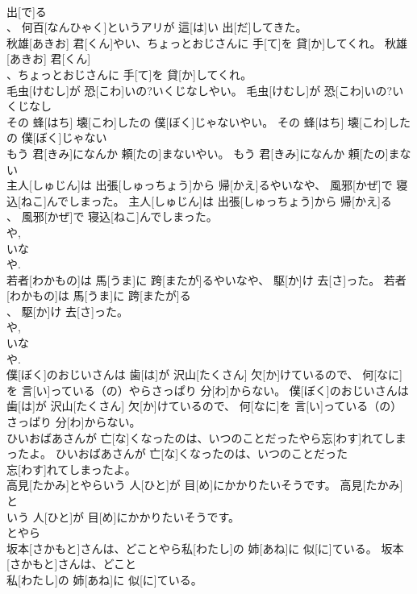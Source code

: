 \documentclass[8pt]{extreport}
\begin{document}
\begin{CJK}{UTF8}{min}
\\	出[で]る
\\	、 何百[なんひゃく]というアリが 這[は]い 出[だ]してきた。	
\\	秋雄[あきお] 君[くん]やい、ちょっとおじさんに 手[て]を 貸[か]してくれ。	秋雄[あきお] 君[くん]
\\	、ちょっとおじさんに 手[て]を 貸[か]してくれ。	
\\	毛虫[けむし]が 恐[こわ]いの?いくじなしやい。	毛虫[けむし]が 恐[こわ]いの?いくじなし
\\	その 蜂[はち] 壊[こわ]したの 僕[ぼく]じゃないやい。	その 蜂[はち] 壊[こわ]したの 僕[ぼく]じゃない
\\	もう 君[きみ]になんか 頼[たの]まないやい。	もう 君[きみ]になんか 頼[たの]まない
\\	主人[しゅじん]は 出張[しゅっちょう]から 帰[かえ]るやいなや、 風邪[かぜ]で 寝込[ねこ]んでしまった。	主人[しゅじん]は 出張[しゅっちょう]から 帰[かえ]る
\\	、 風邪[かぜ]で 寝込[ねこ]んでしまった。	
\\	や, 
\\	いな 
\\	や.
\\	若者[わかもの]は 馬[うま]に 跨[またが]るやいなや、 駆[か]け 去[さ]った。	若者[わかもの]は 馬[うま]に 跨[またが]る
\\	、 駆[か]け 去[さ]った。	
\\	や, 
\\	いな 
\\	や.
\\	僕[ぼく]のおじいさんは 歯[は]が 沢山[たくさん] 欠[か]けているので、 何[なに]を 言[い]っている（の）やらさっぱり 分[わ]からない。	僕[ぼく]のおじいさんは 歯[は]が 沢山[たくさん] 欠[か]けているので、 何[なに]を 言[い]っている（の）
\\	さっぱり 分[わ]からない。	
\\	ひいおばあさんが 亡[な]くなったのは、いつのことだったやら忘[わす]れてしまったよ。	ひいおばあさんが 亡[な]くなったのは、いつのことだった
\\	忘[わす]れてしまったよ。	
\\	高見[たかみ]とやらいう 人[ひと]が 目[め]にかかりたいそうです。	高見[たかみ]と
\\	いう 人[ひと]が 目[め]にかかりたいそうです。	
\\	とやら
\\	坂本[さかもと]さんは、どことやら私[わたし]の 姉[あね]に 似[に]ている。	坂本[さかもと]さんは、どこと
\\	私[わたし]の 姉[あね]に 似[に]ている。	

\end{CJK}
\end{document}
